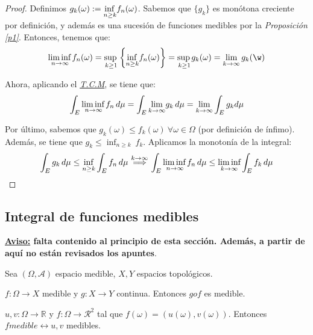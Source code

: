   \begin{proof} Definimos $g_k(\omega) :=  \underset{n\geq k}{\text{inf\,} } f_n(\omega )$. Sabemos que $\{g_k\}$ es monótona creciente por definición, y además es una sucesión de funciones medibles por la \textit{Proposición \ref{p1}}. Entonces, tenemos que: $$\underset{n\to \infty}{\text{lim\,inf\,}} f_n (\omega ) = \underset{k\geq 1}{\text{sup\,}}  \left\{ \underset{n\geq k}{\text{inf\,} } f_n(\omega )\right\}  =  \underset{k\geq 1}{\text{sup\,}} g_k(\omega) = \lim_{k\to\infty} g_k(\w)$$

Ahora, aplicando el \hyperref[tcm]{\textit{T.C.M}}, se tiene que:
\[
\int_E \underset{n\to \infty}{\text{lim\,inf\,}} f_n\, d\mu  =  \int_E \underset{k\to \infty}{\text{lim}} g_k\, d\mu
 =  \underset{k\to \infty}{\text{lim}}  \int_E g_k d\mu
\]

Por último, sabemos que $g_k(\omega)\leq f_k(\omega) \ \forall \omega\in \Omega $ (por definición de ínfimo). Además, se tiene que $g_k \le \inf_{n\ge k}\ f_k$. Aplicamos la monotonía de la integral:
\[
\int_E g_k\, d\mu  \leq \inf_{n\ge k} \int_E f_n\, d\mu
\overset{k\to\infty}{\implies}
\int_E \underset{n\to \infty}{\text{lim\,inf\,}} f_n\, d\mu
\leq   \underset{k\to \infty}{\lim \text{inf}} \int_E f_k\, d\mu
\]
\end{proof}

\subsection{Integral de funciones medibles}
\textbf{\underline{Aviso:} falta contenido al principio de esta sección. Además, a partir de aquí no están revisados los apuntes}.

\begin{lema}
Sea $(\Omega , \mathcal{A})$ espacio medible, $X,Y$ espacios topológicos.
\begin{nlist}
\item $f:\Omega\rightarrow X$ medible y $g:X\rightarrow Y$ continua. Entonces $gof$ es medible.
\item $u,v:\Omega\rightarrow \mathbb{R}$ y $f:\Omega\rightarrow \mathcal{R}^2$ tal que $f(\omega)=(u(\omega),v(\omega))$. Entonces $f medible \leftrightarrow u,v$ medibles.
\end{nlist}
\end{lema}


